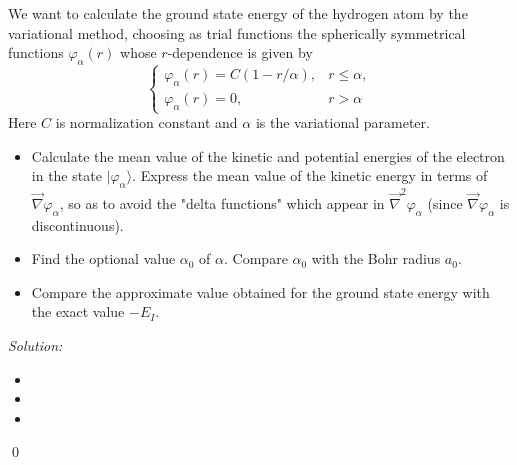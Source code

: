 \documentclass[10pt,a4paper]{article}
\newenvironment{problem}[2][Problem]{\begin{trivlist}
\item[\hskip \labelsep {\bfseries #1}\hskip \labelsep {\bfseries #2.}]}{\end{trivlist}}
\newenvironment{sol}
    {\emph{Solution:}
    }
    {
    \qed
    }
\begin{document}
\begin{problem}{5}
[C-T Exercise 11-9] We want to calculate the ground state energy of the hydrogen atom by the variational method, choosing as trial functions the spherically symmetrical functions $\varphi_{\alpha}(r)$ whose $r$-dependence is given by
\[
\left\{\begin{array}{ll}
\varphi_{\alpha}(r)=C(1-r/\alpha),&r\leq\alpha,\\
\varphi_{\alpha}(r)=0,&r>\alpha
\end{array}\right.
\]
Here $C$ is normalization constant and $\alpha$ is the variational parameter.
\begin{itemize}
\item[(a)] Calculate the mean value of the kinetic and potential energies of the electron in the state $|\varphi_{\alpha}\rangle$. Express the mean value of the kinetic energy in terms of $\vec{\nabla}\varphi_{\alpha}$, so as to avoid the "delta functions" which appear in $\vec{\nabla}^2\varphi_{\alpha}$ (since $\vec{\nabla}\varphi_{\alpha}$ is discontinuous).
\item[(b)] Find the optional value $\alpha_0$ of $\alpha$. Compare $\alpha_0$ with the Bohr radius $a_0$.
\item[(c)] Compare the approximate value obtained for the ground state energy with the exact value $-E_I$.
\end{itemize}
\end{problem}
\begin{sol}
\begin{itemize}
\item[(a)] 
\item[(b)] 
\item[(c)] 
\end{itemize}
\end{sol}
\end{document}
